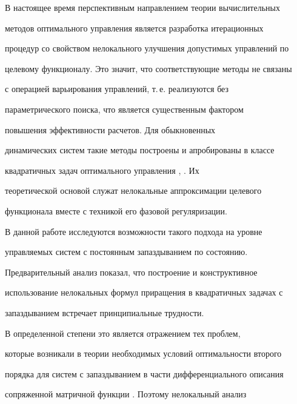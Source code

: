 

\maketitle


\label{begin}





В настоящее время перспективным направлением теории вычислительных


методов оптимального управления является разработка итерационных


процедур со свойством нелокального улучшения допустимых управлений по


целевому функционалу. Это значит, что соответствующие методы не связаны


с операцией варьирования управлений, т.\,е. реализуются без


параметрического поиска, что является существенным фактором


повышения эффективности расчетов. Для обыкновенных


динамических систем такие методы построены и апробированы в классе


квадратичных задач оптимального управления \cite{71}, \cite{70}. Их


теоретической основой служат нелокальные аппроксимации целевого


функционала вместе с техникой его фазовой регуляризации.





В данной работе исследуются возможности такого подхода на уровне


управляемых систем с постоянным запаздыванием по состоянию.


Предварительный анализ показал, что построение и конструктивное


использование нелокальных формул приращения в квадратичных задачах с


запаздыванием встречает принципиальные трудности.


В определенной степени это является отражением тех проблем,


которые возникали в теории необходимых условий оптимальности второго


порядка для систем с запаздыванием в части дифференциального описания


сопряженной матричной функции \cite{49}. Поэтому нелокальный анализ


